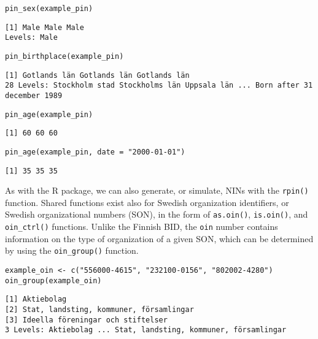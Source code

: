 \begin{verbatim}
pin_sex(example_pin)
\end{verbatim}

\begin{verbatim}
[1] Male Male Male
Levels: Male
\end{verbatim}

\begin{verbatim}
pin_birthplace(example_pin)
\end{verbatim}

\begin{verbatim}
[1] Gotlands län Gotlands län Gotlands län
28 Levels: Stockholm stad Stockholms län Uppsala län ... Born after 31 december 1989
\end{verbatim}

\begin{verbatim}
pin_age(example_pin)
\end{verbatim}

\begin{verbatim}
[1] 60 60 60
\end{verbatim}

\begin{verbatim}
pin_age(example_pin, date = "2000-01-01")
\end{verbatim}

\begin{verbatim}
[1] 35 35 35
\end{verbatim}

As with the  R package, we can also generate, or simulate, NINs with the \texttt{rpin()} function. Shared functions exist also for Swedish organization identifiers, or Swedish organizational numbers (SON), in the form of \texttt{as.oin()}, \texttt{is.oin()}, and \texttt{oin\_ctrl()} functions. Unlike the Finnish BID, the \texttt{oin} number contains information on the type of organization of a given SON, which can be determined by using the \texttt{oin\_group()} function.

\begin{verbatim}
example_oin <- c("556000-4615", "232100-0156", "802002-4280")
oin_group(example_oin)
\end{verbatim}

\begin{verbatim}
[1] Aktiebolag                             
[2] Stat, landsting, kommuner, församlingar
[3] Ideella föreningar och stiftelser      
3 Levels: Aktiebolag ... Stat, landsting, kommuner, församlingar
\end{verbatim}


